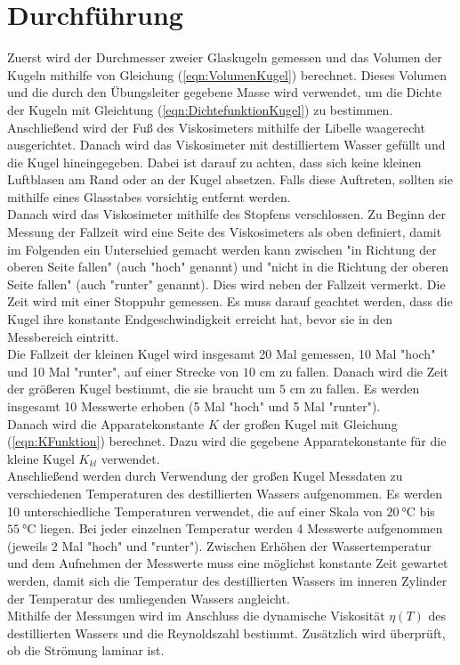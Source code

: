 \section{Durchführung}
\label{sec:Durchführung}
Zuerst wird der Durchmesser zweier Glaskugeln gemessen und das Volumen der Kugeln mithilfe von Gleichung
(\ref{eqn:VolumenKugel}) berechnet. Dieses Volumen und die durch den Übungsleiter gegebene Masse 
wird verwendet, um die Dichte der Kugeln mit Gleichtung 
(\ref{eqn:DichtefunktionKugel}) zu bestimmen.  \\
Anschließend wird der Fuß des Viskosimeters mithilfe der Libelle waagerecht ausgerichtet. 
Danach wird das Viskosimeter mit destilliertem Wasser gefüllt und die Kugel hineingegeben. 
Dabei ist darauf zu achten, dass sich keine kleinen Luftblasen am Rand oder an der Kugel absetzen. 
Falls diese Auftreten, sollten sie mithilfe eines Glasstabes vorsichtig entfernt werden. \\Danach wird 
das Viskosimeter mithilfe des Stopfens verschlossen. Zu Beginn der Messung der Fallzeit wird eine Seite 
des Viskosimeters als oben definiert, damit im Folgenden ein Unterschied gemacht werden kann zwischen 
"in Richtung der oberen Seite fallen" (auch "hoch" genannt) und "nicht in die Richtung der oberen Seite fallen"
(auch "runter" genannt). Dies wird neben der Fallzeit vermerkt. Die Zeit wird mit einer Stoppuhr gemessen. 
Es muss darauf geachtet werden, dass
die Kugel ihre konstante Endgeschwindigkeit erreicht hat, bevor sie in den Messbereich eintritt.\\ 
Die Fallzeit der kleinen Kugel wird insgesamt 20 Mal gemessen, 10 Mal "hoch"\,\,und 10 Mal "runter", auf einer Strecke von 
$10$ \unit{\centi\meter} zu fallen. Danach wird die Zeit der größeren Kugel bestimmt, 
die sie braucht um $5$ \unit{\centi\meter} zu fallen.
Es werden insgesamt 10 Messwerte erhoben (5 Mal "hoch"\,\,und 5 Mal "runter").\\
Danach wird die Apparatekonstante $K$ der großen Kugel mit Gleichung (\ref{eqn:KFunktion}) berechnet. Dazu wird die gegebene 
Apparatekonstante für die kleine Kugel $K_{kl}$ %
verwendet. \\
Anschließend werden durch Verwendung der großen Kugel Messdaten zu verschiedenen Temperaturen des 
destillierten Wassers aufgenommen. 
Es werden 10 unterschiedliche Temperaturen verwendet, die auf einer Skala von $\SI{20}{\celsius}$ bis 
$\SI{55}{\celsius}$ liegen. Bei jeder einzelnen Temperatur werden 4 Messwerte aufgenommen (jeweils 2 Mal 
"hoch"\,\,und "runter").
Zwischen Erhöhen der Wassertemperatur und dem Aufnehmen der Messwerte muss eine möglichst konstante Zeit 
gewartet werden, damit sich die Temperatur des destillierten Wassers im inneren Zylinder der Temperatur des umliegenden 
Wassers angleicht. \\
Mithilfe der Messungen wird im Anschluss die dynamische Viskosität $\eta(T)$ des destillierten Wassers und die 
Reynoldszahl bestimmt. Zusätzlich wird überprüft, ob die Strömung laminar ist.

